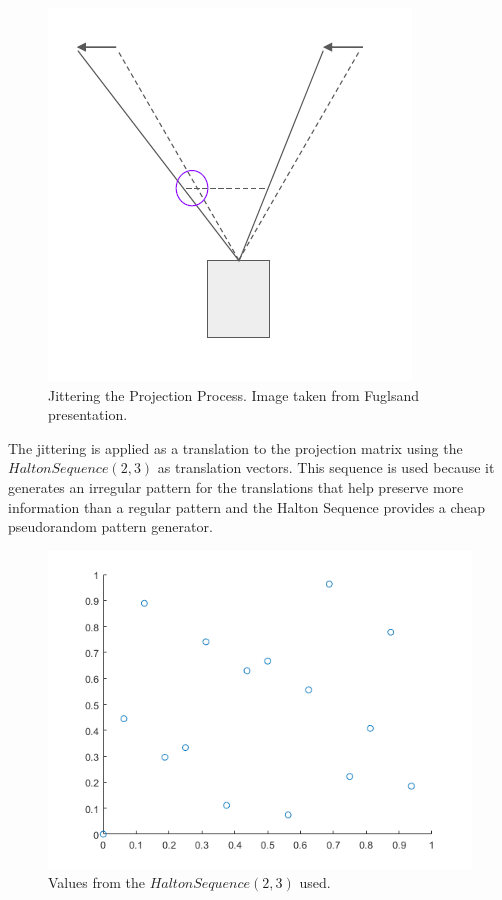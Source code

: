 \documentclass{cslthse-msc}
\begin{document}
\begin{figure}[!hbt]
	\centering
	\includegraphics[scale=0.3]{images/camera_jitter.png}
	\caption{Jittering the Projection Process. Image taken from Fuglsand presentation. \protect\cite{Fuglsand2016}}\label{fig:camerajittering}
\end{figure}

The jittering is applied as a translation to the projection matrix using the $Halton Sequence (2,3)$ as translation vectors. This sequence is used because it generates an irregular pattern for the translations that help preserve more information than a regular pattern and the Halton Sequence provides a cheap pseudorandom pattern generator. ~\cite{Fuglsand2016,XU2016} 

\begin{figure}[!hbt]
	\centering
	\includegraphics[scale=0.5]{images/halton_16.png}
	\caption{Values from the $Halton Sequence (2,3)$ used.}\label{fig:halton16}
\end{figure}
\end{document}
